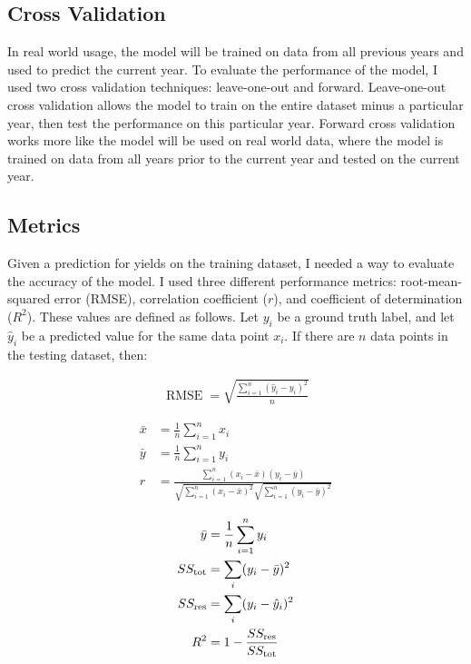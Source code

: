 \documentclass[letterpaper]{article}
\begin{document}
\subsection{Cross Validation}

In real world usage, the model will be trained on data from all previous years and used to predict the current year. To evaluate the performance of the model, I used two cross validation techniques: leave-one-out and forward. Leave-one-out cross validation allows the model to train on the entire dataset minus a particular year, then test the performance on this particular year. Forward cross validation works more like the model will be used on real world data, where the model is trained on data from all years prior to the current year and tested on the current year.

\subsection{Metrics}

Given a prediction for yields on the training dataset, I needed a way to evaluate the accuracy of the model. I used three different performance metrics: root-mean-squared error (RMSE), correlation coefficient ($r$), and coefficient of determination ($R^2$). These values are defined as follows. Let $y_i$ be a ground truth label, and let $\hat{y}_i$ be a predicted value for the same data point $x_i$. If there are $n$ data points in the testing dataset, then:

\begin{align*}
\operatorname{RMSE} = \sqrt{\frac{\sum_{i=1}^n (\hat y_i - y_i)^2}{n}}
\end{align*}

\begin{align*}
\bar{x} &= \frac{1}{n}\sum_{i=1}^n x_i \\
\bar{y} &= \frac{1}{n}\sum_{i=1}^n y_i \\
r &= \frac{\sum ^n _{i=1}(x_i - \bar{x})(y_i - \bar{y})}{\sqrt{\sum ^n _{i=1}(x_i - \bar{x})^2} \sqrt{\sum ^n _{i=1}(y_i - \bar{y})^2}}
\end{align*}

\begin{align*}
\bar{y} &= \frac{1}{n}\sum_{i=1}^n y_i \\
SS_\text{tot} &= \sum_i (y_i-\bar{y})^2 \\
SS_\text{res} &= \sum_i (y_i - \hat y_i)^2 \\
R^2 &= 1 - \frac{SS_{\rm res}}{SS_{\rm tot}}
\end{align*}
\end{document}
